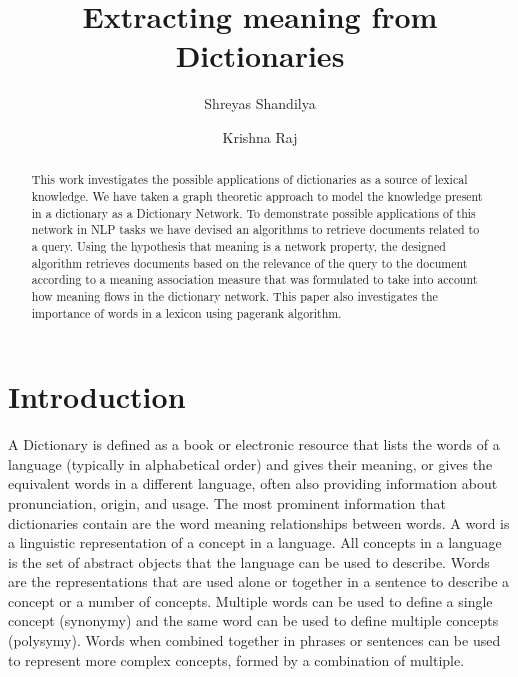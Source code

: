 \documentclass[runningheads]{llncs}
\begin{document}
%
\title{Extracting meaning from Dictionaries}
%
%
\author{Shreyas Shandilya \and
Krishna Raj}
%
%
%
\maketitle              %
%
\begin{abstract}
This work investigates the possible applications of dictionaries as a source of lexical knowledge. We have taken a graph theoretic approach to model the knowledge present in a dictionary as a Dictionary Network. To demonstrate possible applications of this network in NLP tasks we have devised an algorithms to retrieve documents related to a query. Using the hypothesis that meaning is a network property, the designed algorithm retrieves documents based on the relevance of the query to the document according to a meaning association measure that was formulated to take into account how meaning flows in the dictionary network. This paper also investigates the importance of words in a lexicon using pagerank algorithm. 

\end{abstract}
%
%
%
\section{Introduction}
A Dictionary is defined as a book or electronic resource that lists the words of a language (typically in alphabetical order) and gives their meaning, or gives the equivalent words in a different language, often also providing information about pronunciation, origin, and usage. The most prominent information that dictionaries contain are the word meaning relationships between words. A word is a linguistic representation of a concept in a language. All concepts in a language is the set of abstract objects that the language can be used to describe. Words are the representations that are used alone or together in a sentence to describe a concept or a number of concepts. Multiple words can be used to define a single concept (synonymy) and the same word can be used to define multiple concepts (polysymy). Words when combined together in phrases or sentences can be used to represent more complex concepts, formed by a combination of multiple. 
\end{document}
